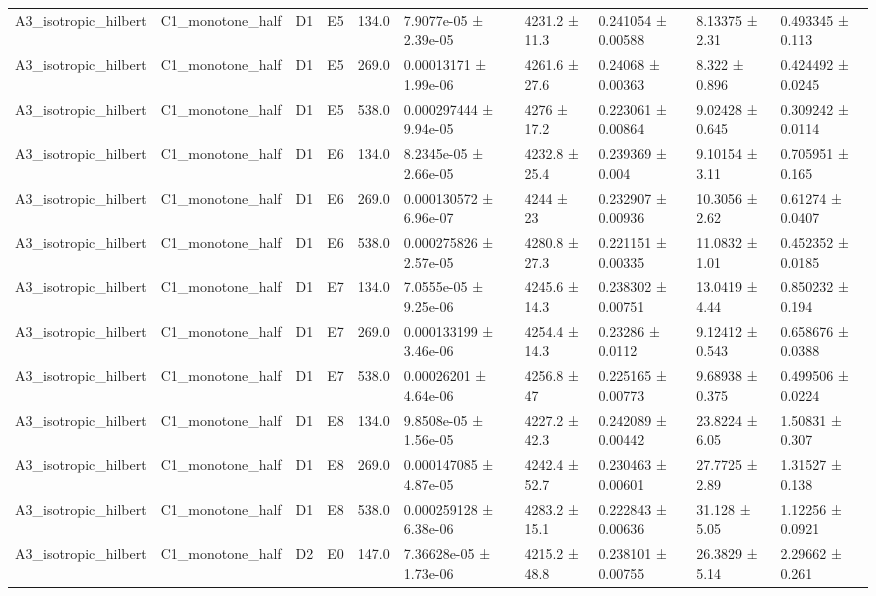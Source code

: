 \begin{table}
\begin{tabular}{llllllllll}
A3\_isotropic\_hilbert & C1\_monotone\_half & D1 & E5 & 134.0 & 7.9077e-05 ± 2.39e-05 & 4231.2 ± 11.3 & 0.241054 ± 0.00588 & 8.13375 ± 2.31 & 0.493345 ± 0.113 \\
A3\_isotropic\_hilbert & C1\_monotone\_half & D1 & E5 & 269.0 & 0.00013171 ± 1.99e-06 & 4261.6 ± 27.6 & 0.24068 ± 0.00363 & 8.322 ± 0.896 & 0.424492 ± 0.0245 \\
A3\_isotropic\_hilbert & C1\_monotone\_half & D1 & E5 & 538.0 & 0.000297444 ± 9.94e-05 & 4276 ± 17.2 & 0.223061 ± 0.00864 & 9.02428 ± 0.645 & 0.309242 ± 0.0114 \\
A3\_isotropic\_hilbert & C1\_monotone\_half & D1 & E6 & 134.0 & 8.2345e-05 ± 2.66e-05 & 4232.8 ± 25.4 & 0.239369 ± 0.004 & 9.10154 ± 3.11 & 0.705951 ± 0.165 \\
A3\_isotropic\_hilbert & C1\_monotone\_half & D1 & E6 & 269.0 & 0.000130572 ± 6.96e-07 & 4244 ± 23 & 0.232907 ± 0.00936 & 10.3056 ± 2.62 & 0.61274 ± 0.0407 \\
A3\_isotropic\_hilbert & C1\_monotone\_half & D1 & E6 & 538.0 & 0.000275826 ± 2.57e-05 & 4280.8 ± 27.3 & 0.221151 ± 0.00335 & 11.0832 ± 1.01 & 0.452352 ± 0.0185 \\
A3\_isotropic\_hilbert & C1\_monotone\_half & D1 & E7 & 134.0 & 7.0555e-05 ± 9.25e-06 & 4245.6 ± 14.3 & 0.238302 ± 0.00751 & 13.0419 ± 4.44 & 0.850232 ± 0.194 \\
A3\_isotropic\_hilbert & C1\_monotone\_half & D1 & E7 & 269.0 & 0.000133199 ± 3.46e-06 & 4254.4 ± 14.3 & 0.23286 ± 0.0112 & 9.12412 ± 0.543 & 0.658676 ± 0.0388 \\
A3\_isotropic\_hilbert & C1\_monotone\_half & D1 & E7 & 538.0 & 0.00026201 ± 4.64e-06 & 4256.8 ± 47 & 0.225165 ± 0.00773 & 9.68938 ± 0.375 & 0.499506 ± 0.0224 \\
A3\_isotropic\_hilbert & C1\_monotone\_half & D1 & E8 & 134.0 & 9.8508e-05 ± 1.56e-05 & 4227.2 ± 42.3 & 0.242089 ± 0.00442 & 23.8224 ± 6.05 & 1.50831 ± 0.307 \\
A3\_isotropic\_hilbert & C1\_monotone\_half & D1 & E8 & 269.0 & 0.000147085 ± 4.87e-05 & 4242.4 ± 52.7 & 0.230463 ± 0.00601 & 27.7725 ± 2.89 & 1.31527 ± 0.138 \\
A3\_isotropic\_hilbert & C1\_monotone\_half & D1 & E8 & 538.0 & 0.000259128 ± 6.38e-06 & 4283.2 ± 15.1 & 0.222843 ± 0.00636 & 31.128 ± 5.05 & 1.12256 ± 0.0921 \\
A3\_isotropic\_hilbert & C1\_monotone\_half & D2 & E0 & 147.0 & 7.36628e-05 ± 1.73e-06 & 4215.2 ± 48.8 & 0.238101 ± 0.00755 & 26.3829 ± 5.14 & 2.29662 ± 0.261 \\

\end{tabular}
\end{table}
